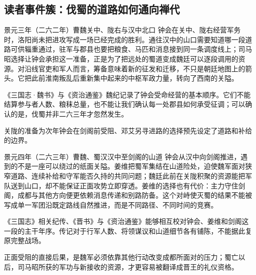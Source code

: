 \subsection{读者事件簇：伐蜀的道路如何通向禅代}

\begin{event}{}{景元三年（二六二年）}{曹魏}{关中、陇右与汉中北口}
钟会在关中、陇右经营军务时，洛阳尚未把进攻写成一场已经完成的胜利。通往汉中的山口需要知道哪一段道路可供辎重通过，驻军与郡县也要把粮食、马匹和消息接到同一条调度线上；司马昭选择让钟会承担这一准备，正是为了把远处的蜀道变成魏廷可以逐段调用的资源。对沿线官吏和军人而言，筹备意味着新的征发和迁移，不只是朝廷地图上的箭头。它把此前淮南叛乱后重新集中起来的中枢军政力量，转向了西南的关隘。

\begin{sourcenote}[关陇的准备没有留下可相加的兵粮总表]
《三国志·魏书》与《资治通鉴》魏纪记录了钟会受命经营的基本顺序。它们不能结算参与者人数、粮秣总量，也不能让我们确认每一处郡县如何承受征调；可以确认的是，伐蜀并非二六三年才忽然发生。
\end{sourcenote}
关陇的准备为次年钟会在剑阁前受阻、邓艾另寻进路的选择预先设定了道路和补给的边界。
\end{event}

\begin{event}{}{景元四年（二六三年）}{曹魏、蜀汉}{汉中至剑阁的山道}
钟会从汉中向剑阁推进，遇到的不是一座可以绕过的纸面关隘。姜维把蜀军集结在山道险处，迫使魏军面对狭窄道路、连续补给和守军能否久持的共同问题；魏廷此前在关陇积聚的资源能把军队送到山口，却不能保证正面攻势立即穿透。姜维的选择也有代价：主力守住剑阁，成都与其他方向便更依赖消息传递和别路防备。这个对峙使灭蜀的结果不能被写成单一军团沿既定路线自然推进，而是不同路径、不同时间的竞赛。

\begin{sourcenote}
《三国志》相关纪传、《晋书》与《资治通鉴》能够相互校对钟会、姜维和剑阁这一段的主干年序。传记对于行军人数、将领谋议和山道细节各有铺陈，不能据此复原完整战场。
\end{sourcenote}
正面受阻的直接后果，是魏军必须依靠其他行动改变成都所面对的压力；蜀亡以后，司马昭所获的军功与新接收的资源，才更容易被翻译成晋王的礼仪资格。
\end{event}

